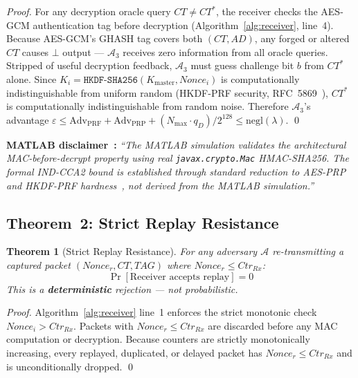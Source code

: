\documentclass[conference]{IEEEtran}
\newtheorem{theorem}{Theorem}
\newcommand{\HKDF}{\texttt{HKDF-SHA256}}
\newcommand{\Kmaster}{K_{\mathrm{master}}}
\newcommand{\Nmax}{N_{\max}}
\begin{document}
\begin{proof}
For any decryption oracle query $CT \neq CT^*$, the receiver checks
the AES-GCM authentication tag before decryption (Algorithm~\ref{alg:receiver},
line~4). Because AES-GCM's GHASH tag covers both $(CT, AD)$, any forged
or altered $CT$ causes $\bot$ output --- $\mathcal{A}_3$ receives zero
information from all oracle queries. Stripped of useful decryption
feedback, $\mathcal{A}_3$ must guess challenge bit $b$ from $CT^*$ alone.
Since $K_i = \HKDF{}(\Kmaster, \mathit{Nonce}_i)$ is computationally
indistinguishable from uniform random (HKDF-PRF security,
RFC~5869~\cite{rfc5869}), $CT^*$ is computationally indistinguishable
from random noise. Therefore $\mathcal{A}_3$'s advantage $\varepsilon
\leq \mathrm{Adv}_{\mathrm{PRF}} + \mathrm{Adv}_{\mathrm{PRP}} +
(\Nmax \cdot q_D)/2^{128} \leq \mathrm{negl}(\lambda)$. \qed
\end{proof}

\noindent\textbf{MATLAB disclaimer~\cite{cryptoreview}:}
\emph{``The MATLAB simulation validates the architectural MAC-before-decrypt
property using real \texttt{javax.crypto.Mac} HMAC-SHA256. The formal IND-CCA2
bound is established through standard reduction to AES-PRP and HKDF-PRF
hardness~\cite{rfc5869}, not derived from the MATLAB simulation.''}

\subsection{Theorem~2: Strict Replay Resistance}

\begin{theorem}[Strict Replay Resistance]
\label{thm:replay}
For any adversary $\mathcal{A}$ re-transmitting a captured packet
$(\mathit{Nonce}_r, CT, TAG)$ where $\mathit{Nonce}_r \leq \mathit{Ctr}_{Rx}$:
\begin{equation}
\Pr[\text{Receiver accepts replay}] = 0
\end{equation}
This is a \textbf{deterministic} rejection --- not probabilistic.
\end{theorem}

\begin{proof}
Algorithm~\ref{alg:receiver} line~1 enforces the strict monotonic check
$\mathit{Nonce}_i > \mathit{Ctr}_{Rx}$. Packets with
$\mathit{Nonce}_r \leq \mathit{Ctr}_{Rx}$ are discarded before any MAC
computation or decryption. Because counters are strictly monotonically
increasing, every replayed, duplicated, or delayed packet has
$\mathit{Nonce}_r \leq \mathit{Ctr}_{Rx}$ and is unconditionally dropped.
\qed
\end{proof}
\end{document}
